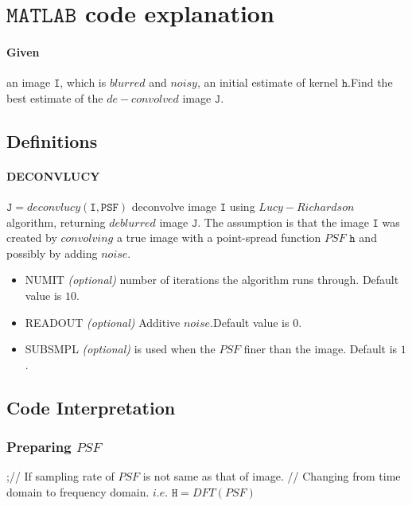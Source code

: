 \documentclass[a4paper]{book}
\begin{document}
\section{\Large $ \mathtt{MATLAB} $ code explanation}

\paragraph* {Given} an image $\mathtt{I}$, which is $ \textit{blurred} $ and $ \textit{noisy} $, an initial estimate of kernel $\mathtt{h}$.Find the best estimate of the $ de-convolved $ image $ \mathtt{J}$.

\subsection{Definitions}
\paragraph*{\normalsize DECONVLUCY}$\mathtt{J} = deconvlucy(\mathtt{I,PSF})$ deconvolve image $ \mathtt{I} $ using $ Lucy-Richardson $ algorithm, returning $ deblurred $ image $ \mathtt{J} $. The assumption is that the image $ \mathtt{I} $ was created by $ convolving $ a true image with a point-spread function $ PSF$ $\mathtt{h} $ and possibly by adding $ noise $.\\
\begin{itemize}
	\item NUMIT \textit{(optional)} number of iterations the algorithm runs through. Default value is $ 10 $.
	\item READOUT \textit{(optional)} Additive $ noise $.Default value is $ 0 $.
	\item SUBSMPL \textit{(optional)} is used when the $ PSF $ finer than the image. Default is $ 1 $.
\end{itemize}
%
%

\subsection{Code Interpretation}
\subsubsection{Preparing $ PSF $}
;// If sampling rate of $ PSF $ is not same as that of image.
// Changing from time domain to frequency domain. $ i.e.$ $ \mathtt{H} = DFT(PSF)$
\end{document}

